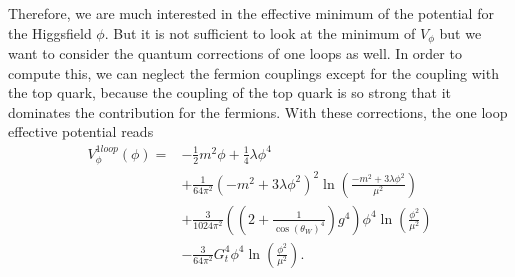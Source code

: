 \documentclass{article}
\numberwithin{equation}{section}
\begin{document}
Therefore, we are much interested in the effective minimum of the potential for the Higgsfield $\phi$. But it is not sufficient to look at the minimum of $V_{\phi}$ but we want to consider the quantum corrections of one loops as well. In order to compute this, we can neglect the fermion couplings except for the coupling with the top quark, because the coupling of the top quark is so strong that it dominates the contribution for the fermions. 
With these corrections, the one loop effective potential reads
\begin{align*}
    V_{\phi}^{1loop}(\phi) =& -\frac{1}{2}m^2\phi + \frac{1}{4}\lambda\phi^4\\
    & +\frac{1}{64\pi^2}(-m^2 +3\lambda\phi^2)^2\ln\left(\frac{-m^2+3\lambda\phi^2}{\mu^2}\right)\\
    &+\frac{3}{1024 \pi^2}((2 + \frac{1}{\cos(\theta_W)^4})g^4)\phi^4 \ln\left(\frac{\phi^2}{\mu^2}\right)\\
    &-\frac{3}{64 \pi^2}G_t^4 \phi^4 \ln\left(\frac{\phi^2}{\mu^2}\right). 
\end{align*}
\end{document}
